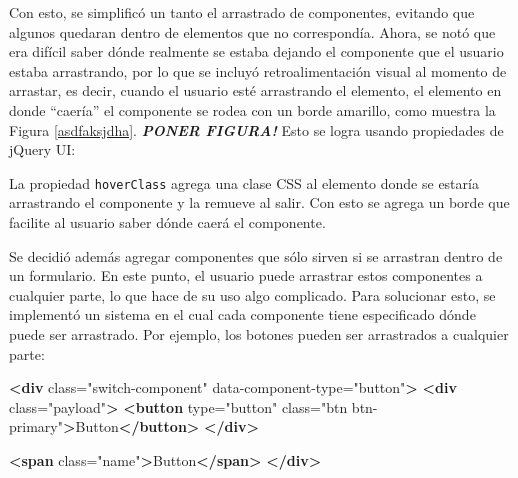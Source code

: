\documentclass[12pt,titlepage,]{article}
\newenvironment{Shaded}{}{}
\newcommand{\KeywordTok}[1]{\textcolor[rgb]{0.00,0.44,0.13}{\textbf{{#1}}}}
\newcommand{\StringTok}[1]{\textcolor[rgb]{0.25,0.44,0.63}{{#1}}}
\newcommand{\CommentTok}[1]{\textcolor[rgb]{0.38,0.63,0.69}{\textit{{#1}}}}
\newcommand{\OtherTok}[1]{\textcolor[rgb]{0.00,0.44,0.13}{{#1}}}
\newcommand{\NormalTok}[1]{{#1}}
\begin{document}
Con esto, se simplificó un tanto el arrastrado de componentes, evitando
que algunos quedaran dentro de elementos que no correspondía. Ahora, se
notó que era difícil saber dónde realmente se estaba dejando el
componente que el usuario estaba arrastrando, por lo que se incluyó
retroalimentación visual al momento de arrastar, es decir, cuando el
usuario esté arrastrando el elemento, el elemento en donde ``caería'' el
componente se rodea con un borde amarillo, como muestra la Figura
\ref{asdfaksjdha}. \textbf{\emph{PONER FIGURA!}} Esto se logra usando
propiedades de jQuery UI:

\begin{Shaded}
\end{Shaded}

La propiedad \texttt{hoverClass} agrega una clase CSS al elemento donde
se estaría arrastrando el componente y la remueve al salir. Con esto se
agrega un borde que facilite al usuario saber dónde caerá el componente.

Se decidió además agregar componentes que sólo sirven si se arrastran
dentro de un formulario. En este punto, el usuario puede arrastrar estos
componentes a cualquier parte, lo que hace de su uso algo complicado.
Para solucionar esto, se implementó un sistema en el cual cada
componente tiene especificado dónde puede ser arrastrado. Por ejemplo,
los botones pueden ser arrastrados a cualquier parte:

\begin{Shaded}
\begin{Highlighting}[]
\KeywordTok{<div}\OtherTok{ class=}\StringTok{"switch-component"}\OtherTok{ data-component-type=}\StringTok{"button"}\KeywordTok{>}
  \KeywordTok{<div}\OtherTok{ class=}\StringTok{"payload"}\KeywordTok{>}
    \KeywordTok{<button}\OtherTok{ type=}\StringTok{"button"}\OtherTok{ class=}\StringTok{"btn btn-primary"}\KeywordTok{>}\NormalTok{Button}\KeywordTok{</button>}
  \KeywordTok{</div>}

  \KeywordTok{<span}\OtherTok{ class=}\StringTok{"name"}\KeywordTok{>}\NormalTok{Button}\KeywordTok{</span>}
\KeywordTok{</div>}
\end{Highlighting}
\end{Shaded}
\end{document}
